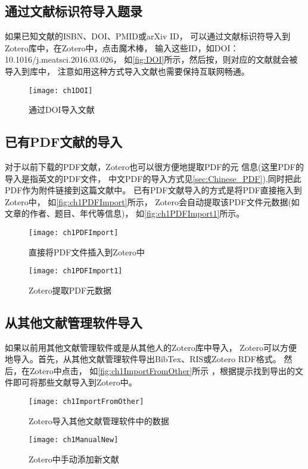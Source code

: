 \documentclass[cn,11pt,chinese]{elegantbook}
\begin{document}
	\subsection{通过文献标识符导入题录}
	如果已知文献的ISBN、DOI、PMID或arXiv ID，
	可以通过文献标识符导入到Zotero库中，在Zotero中，点击魔术棒，
	输入这些ID，如DOI：10.1016/j.meatsci.2016.03.026，
	如\autoref{fig:DOI}所示，然后按，则对应的文献就会被导入到库中，
	注意如用这种方式导入文献也需要保持互联网畅通。
	\begin{figure}[htbp]
		\centering
		\texttt{[image: ch1DOI]}
		\caption{通过DOI导入文献}
		\label{fig:DOI}
	\end{figure}

	\subsection{已有PDF文献的导入} \label{sec:EngPDFIm}
	对于以前下载的PDF文献，Zotero也可以很方便地提取PDF的元
	信息(这里PDF的导入是指英文的PDF文件，
	中文PDF的导入方式见\cref{sec:Chinese_PDF}),同时把此PDF作为附件链接到这篇文献中。
	已有PDF文献导入的方式是将PDF直接拖入到Zotero中，
	如\autoref{fig:ch1PDFImport}所示，
	Zotero会自动提取该PDF文件元数据(如文章的作者、题目、年代等信息)，
	如\autoref{fig:ch1PDFImport1}所示。
	\begin{figure}[htbp]
		\centering
		\texttt{[image: ch1PDFImport]}
		\caption{直接将PDF文件插入到Zotero中}
		\label{fig:ch1PDFImport}
	\end{figure}
	\begin{figure}[htbp]
		\centering
		\texttt{[image: ch1PDFImport1]}
		\caption{Zotero提取PDF元数据}
		\label{fig:ch1PDFImport1}
	\end{figure}
	
	\subsection{从其他文献管理软件导入}\label{OtherRefSoft}
	如果以前用其他文献管理软件或是从其他人的Zotero库中导入，
	Zotero可以方便地导入。首先，从其他文献管理软件导出BibTex、RIS或Zotero RDF格式。
	然后，在Zotero中点击，
	如\autoref{fig:ch1ImportFromOther}所示
	，根据提示找到导出的文件即可将那些文献导入到Zotero中。
	\begin{figure}
		\centering
		\begin{minipage}[t]{\dimexpr0.5\textwidth-4em}
			\centering
			\texttt{[image: ch1ImportFromOther]}
			\caption{Zotero导入其他文献管理软件中的数据}
			\label{fig:ch1ImportFromOther}
		\end{minipage}	
		\hspace{1cm}
		\begin{minipage}[t]{\dimexpr0.5\textwidth-4em}
			\centering
			\texttt{[image: ch1ManualNew]}
			\caption{Zotero中手动添加新文献}
			\label{fig:ch1ManualNew}
		\end{minipage}	
	\end{figure}
\end{document}
